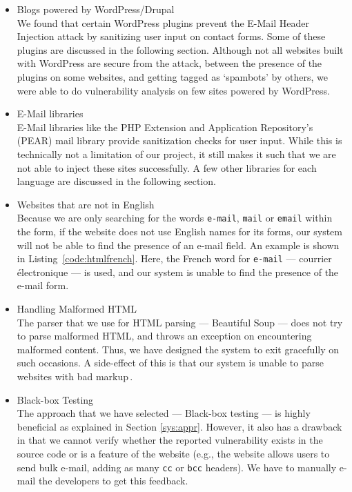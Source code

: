 \begin{itemize}
		\item Blogs powered by WordPress/Drupal\\
		We found that certain WordPress plugins prevent the E-Mail Header Injection attack by sanitizing user input on contact forms. Some of these plugins are discussed in the following section. Although not all websites built with WordPress are secure from the attack, between the presence of the plugins on some websites, and getting tagged as `spambots' by others, we were able to do vulnerability analysis on few sites powered by WordPress.		
		
		\item E-Mail libraries\\
        E-Mail libraries like the PHP Extension and Application Repository's (PEAR) mail library provide sanitization checks for user input. While this is technically not a limitation of our project, it still makes it such that we are not able to inject these sites successfully.
        A few other libraries for each language are discussed in the following section.
        
        \item Websites that are not in English\\
        Because we are only searching for the words \texttt{e-mail}, \texttt{mail} or \texttt{email} within the form, if the website does not use English names for its forms, our system will not be able to find the presence of an e-mail field. An example is shown in Listing~\ref{code:htmlfrench}. Here, the French word for \texttt{e-mail} --- courrier électronique --- is used, and our system is unable to find the presence of the e-mail form.
        
        \item Handling Malformed HTML\\
        The parser that we use for HTML parsing --- Beautiful Soup --- does not try to parse malformed HTML, and throws an exception on encountering malformed content. Thus, we have designed the system to exit gracefully on such occasions. A side-effect of this is that our system is unable to parse websites with bad markup\,\footnotemark.
        
        
        
        \item Black-box Testing\\
        The approach that we have selected --- Black-box testing --- is highly beneficial as explained in Section \ref{sys:appr}. However, it also has a drawback in that we cannot verify whether the reported vulnerability exists in the source code or is a feature of the website (e.g., the website allows users to send bulk e-mail, adding as many \texttt{cc} or \texttt{bcc} headers). We have to manually e-mail the developers to get this feedback.
        

\end{itemize}
